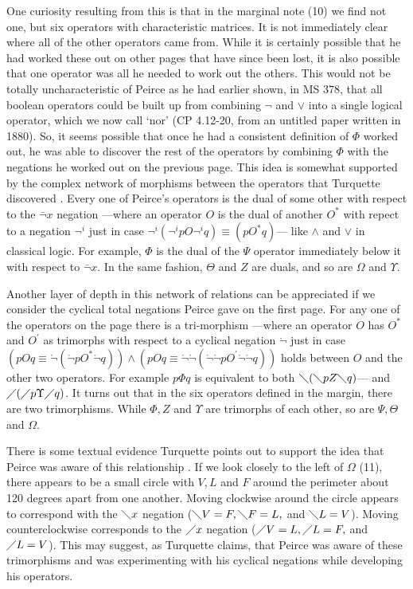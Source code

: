 One curiosity resulting from this is that in the marginal note (10) we find not one, but six operators with characteristic matrices. It is not immediately clear where all of the other operators came from. While it is certainly possible that he had worked these out on other pages that have since been lost, it is also possible that one operator was all he needed to work out the others. This would not be totally uncharacteristic of Peirce as he had earlier shown, in MS 378, that all boolean operators could be built up from combining $\lnot$ and $\lor$ into a single logical operator, which we now call `nor' (CP 4.12-20, from an untitled paper written in 1880). So, it seems possible that once he had a consistent definition of $\Phi$ worked out, he was able to discover the rest of the operators by combining $\Phi$ with the negations he worked out on the previous page. This idea is somewhat supported by the complex network of morphisms between the operators that Turquette discovered \citep{turquette_dualism_1972}. Every one of Peirce's operators is the dual of some other with respect to the $\bar{\lnot}x$ negation ---where an operator $O$ is the dual of another $O^{*}$ with repect to a negation $\lnot^{i}$ just in case $\lnot^{i}(\lnot^{i}p O \lnot^{i}q)\equiv (p O^{*} q)$--- like $\land$ and $\lor$ in classical logic. For example, $\Phi$ is the dual of the $\Psi$ operator immediately below it with respect to $\bar{\lnot}x$. In the same fashion, $\Theta$ and $Z$ are duals, and so are $\Omega$ and $\Upsilon$. 

Another layer of depth in this network of relations can be appreciated if we consider the cyclical total negations Peirce gave on the first page. For any one of the operators on the page there is a tri-morphism ---where an operator $O$ has $O^{*}$ and $O^{'}$ as trimorphs with respect to a cyclical negation $\mathring{\lnot}$ just in case $(pOq\equiv \mathring{\lnot}(\mathring{\lnot}pO^{*}\mathring{\lnot}q))\land (pOq\equiv \mathring{\lnot}\mathring{\lnot}(\mathring{\lnot}\mathring{\lnot}pO^{'}\mathring{\lnot}\mathring{\lnot}q))$ holds between $O$ and the other two operators. For example $p\Phi q$ is equivalent to both $\diagdown{}(\diagdown{p}Z\diagdown{q})$--- and $\diagup{}(\diagup{p}\Upsilon \diagup{q})$. It turns out that in the six operators defined in the margin, there are two trimorphisms. While $\Phi, Z$ and $\Upsilon$ are trimorphs of each other, so are $\Psi, \Theta$ and $\Omega$.

There is some textual evidence Turquette points out to support the idea that Peirce was aware of this relationship \citep{turquette_dualism_1972}. If we look closely to the left of $\Omega$ (11), there appears to be a small circle with $V, L$ and $F$ around the perimeter about 120 degrees apart from one another. Moving clockwise around the circle appears to correspond with the $\diagdown{x}$ negation ($\diagdown{V}=F, \diagdown{F}=L,$ and $\diagdown{L}=V$). Moving counterclockwise corresponds to the $\diagup{x}$ negation ($\diagup{V}=L, \diagup{L}=F,$ and $\diagup{L}=V$). This may suggest, as Turquette claims, that Peirce was aware of these trimorphisms and was experimenting with his cyclical negations while developing his operators.

